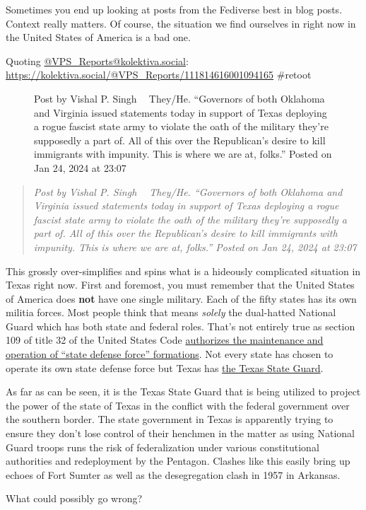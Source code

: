 Sometimes you end up looking at posts from the Fediverse best in blog
posts. Context really matters. Of course, the situation we find
ourselves in right now in the United States of America is a bad one.

Quoting
\href{https://kolektiva.social/@VPS_Reports/}{@VPS\_Reports@kolektiva.social}:
\url{https://kolektiva.social/@VPS_Reports/111814616001094165} \#retoot

\begin{figure}
\centering
{}
\caption{Post by Vishal P. Singh 🏳️‍⚧️ They/He. ``Governors of both
Oklahoma and Virginia issued statements today in support of Texas
deploying a rogue fascist state army to violate the oath of the military
they're supposedly a part of. All of this over the Republican's desire
to kill immigrants with impunity. This is where we are at, folks.''
Posted on Jan 24, 2024 at 23:07}
\end{figure}

\begin{quote}
\emph{Post by Vishal P. Singh 🏳️‍⚧️ They/He. ``Governors of both Oklahoma
and Virginia issued statements today in support of Texas deploying a
rogue fascist state army to violate the oath of the military they're
supposedly a part of. All of this over the Republican's desire to kill
immigrants with impunity. This is where we are at, folks.'' Posted on
Jan 24, 2024 at 23:07}
\end{quote}

This grossly over-simplifies and spins what is a hideously complicated
situation in Texas right now. First and foremost, you must remember that
the United States of America does \textbf{not} have one single military.
Each of the fifty states has its own militia forces. Most people think
that means \emph{solely} the dual-hatted National Guard which has both
state and federal roles. That's not entirely true as section 109 of
title 32 of the United States Code
\href{https://web.archive.org/web/20230519053302/https://www.law.cornell.edu/uscode/text/32/109}{authorizes
the maintenance and operation of ``state defense force'' formations}.
Not every state has chosen to operate its own state defense force but
Texas has
\href{https://web.archive.org/web/20231107171339/https://tmd.texas.gov/state-guard}{the
Texas State Guard}.

As far as can be seen, it is the Texas State Guard that is being
utilized to project the power of the state of Texas in the conflict with
the federal government over the southern border. The state government in
Texas is apparently trying to ensure they don't lose control of their
henchmen in the matter as using National Guard troops runs the risk of
federalization under various constitutional authorities and redeployment
by the Pentagon. Clashes like this easily bring up echoes of Fort Sumter
as well as the desegregation clash in 1957 in Arkansas.

What could possibly go wrong?
